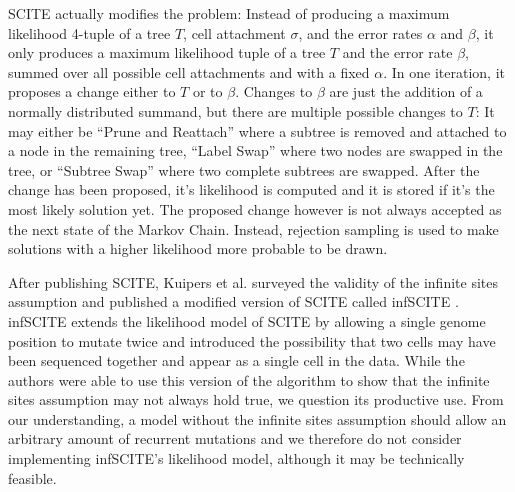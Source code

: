 \ac{SCITE} actually modifies the problem: Instead of producing a maximum likelihood 4-tuple of a tree $T$, cell attachment $\sigma$, and the error rates $\alpha$ and $\beta$, it only produces a maximum likelihood tuple of a tree $T$ and the error rate $\beta$, summed over all possible cell attachments and with a fixed $\alpha$. In one iteration, it proposes a change either to $T$ or to $\beta$. Changes to $\beta$ are just the addition of a normally distributed summand, but there are multiple possible changes to $T$: It may either be ``Prune and Reattach'' where a subtree is removed and attached to a node in the remaining tree, ``Label Swap'' where two nodes are swapped in the tree, or ``Subtree Swap'' where two complete subtrees are swapped. After the change has been proposed, it's likelihood is computed and it is stored if it's the most likely solution yet. The proposed change however is not always accepted as the next state of the Markov Chain. Instead, rejection sampling is used to make solutions with a higher likelihood more probable to be drawn.

After publishing \ac{SCITE}, Kuipers et al. surveyed the validity of the infinite sites assumption and published a modified version of \ac{SCITE} called \ac{infSCITE} \cite{kuipers2017single}. \ac{infSCITE} extends the likelihood model of \ac{SCITE} by allowing a single genome position to mutate twice and introduced the possibility that two cells may have been sequenced together and appear as a single cell in the data. While the authors were able to use this version of the algorithm to show that the infinite sites assumption may not always hold true, we question its productive use. From our understanding, a model without the infinite sites assumption should allow an arbitrary amount of recurrent mutations and we therefore do not consider implementing \ac{infSCITE}'s likelihood model, although it may be technically feasible.